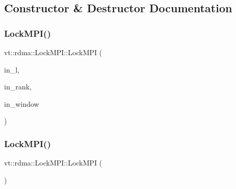 \subsection{Constructor \& Destructor Documentation}
\mbox{\label{structvt_1_1rdma_1_1_lock_m_p_i_ae2b5446ca32b39ea0d726869f113ca20}} 
\subsubsection{\texorpdfstring{Lock\+M\+P\+I()}{LockMPI()}\hspace{0.1cm}{\footnotesize\ttfamily [1/3]}}
{\footnotesize\ttfamily vt\+::rdma\+::\+Lock\+M\+P\+I\+::\+Lock\+M\+PI (\begin{DoxyParamCaption}\item[{\hyperlink{namespacevt_1_1rdma_ac5c20b41a653e520b6305d4d454ecb70}{Lock}}]{in\+\_\+l,  }\item[{\hyperlink{namespacevt_a866da9d0efc19c0a1ce79e9e492f47e2}{vt\+::\+Node\+Type}}]{in\+\_\+rank,  }\item[{M\+P\+I\+\_\+\+Win}]{in\+\_\+window }\end{DoxyParamCaption})\hspace{0.3cm}{\ttfamily [inline]}}

\mbox{\label{structvt_1_1rdma_1_1_lock_m_p_i_a82e24ca254c74bc236c1d46811b84310}} 
\subsubsection{\texorpdfstring{Lock\+M\+P\+I()}{LockMPI()}\hspace{0.1cm}{\footnotesize\ttfamily [2/3]}}
{\footnotesize\ttfamily vt\+::rdma\+::\+Lock\+M\+P\+I\+::\+Lock\+M\+PI (\begin{DoxyParamCaption}\item[{\hyperlink{structvt_1_1rdma_1_1_lock_m_p_i}{Lock\+M\+PI} const \&}]{ }\end{DoxyParamCaption})\hspace{0.3cm}{\ttfamily [delete]}}

